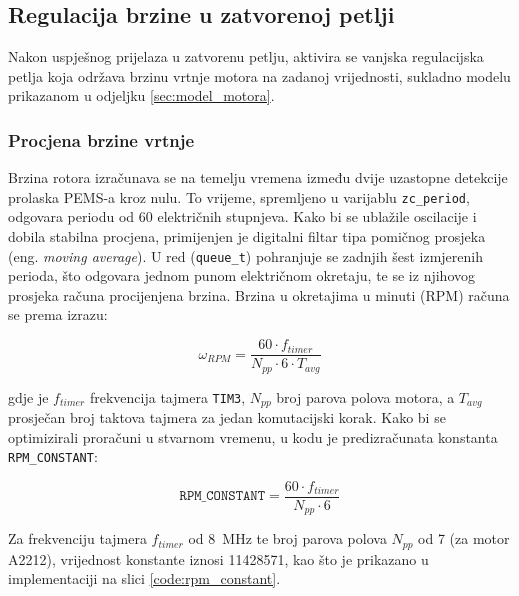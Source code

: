 \documentclass[diplomskirad]{fer}
\begin{document}
\subsection{Regulacija brzine u zatvorenoj petlji}
\label{ssec:regulacija_brzine}

Nakon uspješnog prijelaza u zatvorenu petlju, aktivira se vanjska regulacijska
petlja koja održava brzinu vrtnje motora na zadanoj vrijednosti, sukladno
modelu prikazanom u odjeljku \ref{sec:model_motora}.

\subsubsection{Procjena brzine vrtnje}
\label{sssec:procjena_brzine}

Brzina rotora izračunava se na temelju vremena između dvije uzastopne detekcije
prolaska PEMS-a kroz nulu. To vrijeme, spremljeno u varijablu
\texttt{zc\_period}, odgovara periodu od 60 električnih stupnjeva. Kako bi se
ublažile oscilacije i dobila stabilna procjena, primijenjen je digitalni filtar
tipa pomičnog prosjeka (eng. \textit{moving average}). U red
(\texttt{queue\_t}) pohranjuje se zadnjih šest izmjerenih perioda, što odgovara
jednom punom električnom okretaju, te se iz njihovog prosjeka računa
procijenjena brzina. Brzina u okretajima u minuti (RPM) računa se prema izrazu:

\begin{equation}
	\omega_{RPM} = \frac{60 \cdot f_{timer}}{N_{pp} \cdot 6 \cdot T_{avg}}
\end{equation}

gdje je $f_{timer}$ frekvencija tajmera \texttt{TIM3}, $N_{pp}$ broj parova
polova motora, a $T_{avg}$ prosječan broj taktova tajmera za jedan komutacijski
korak. Kako bi se optimizirali proračuni u stvarnom vremenu, u kodu je
predizračunata konstanta \texttt{RPM\_CONSTANT}:

\begin{equation}
	\texttt{RPM\_CONSTANT} = \frac{60 \cdot f_{timer}}{N_{pp} \cdot 6}
\end{equation}

Za frekvenciju tajmera $f_{timer}$ od \SI{8}{\mega\hertz} te broj parova polova
$N_{pp}$ od 7 (za motor A2212), vrijednost konstante iznosi 11428571, kao što
je prikazano u implementaciji na slici \ref{code:rpm_constant}.
\end{document}
